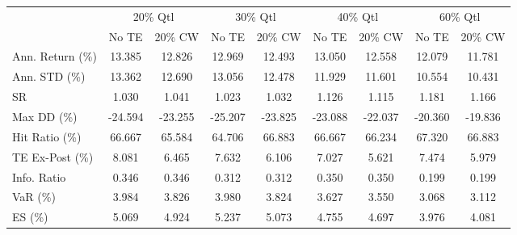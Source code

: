 \begin{tabular}{lcccccccc}
\toprule
{} & \multicolumn{2}{c}{20\% Qtl} & \multicolumn{2}{c}{30\% Qtl} & \multicolumn{2}{c}{40\% Qtl} & \multicolumn{2}{c}{60\% Qtl} \\
{} &   No TE &  20\% CW &   No TE &  20\% CW &   No TE &  20\% CW &   No TE &  20\% CW \\
\midrule
Ann. Return (\%) &  13.385 &  12.826 &  12.969 &  12.493 &  13.050 &  12.558 &  12.079 &  11.781 \\
Ann. STD (\%)    &  13.362 &  12.690 &  13.056 &  12.478 &  11.929 &  11.601 &  10.554 &  10.431 \\
SR              &   1.030 &   1.041 &   1.023 &   1.032 &   1.126 &   1.115 &   1.181 &   1.166 \\
Max DD (\%)      & -24.594 & -23.255 & -25.207 & -23.825 & -23.088 & -22.037 & -20.360 & -19.836 \\
Hit Ratio (\%)   &  66.667 &  65.584 &  64.706 &  66.883 &  66.667 &  66.234 &  67.320 &  66.883 \\
TE Ex-Post (\%)  &   8.081 &   6.465 &   7.632 &   6.106 &   7.027 &   5.621 &   7.474 &   5.979 \\
Info. Ratio     &   0.346 &   0.346 &   0.312 &   0.312 &   0.350 &   0.350 &   0.199 &   0.199 \\
VaR (\%)         &   3.984 &   3.826 &   3.980 &   3.824 &   3.627 &   3.550 &   3.068 &   3.112 \\
ES (\%)          &   5.069 &   4.924 &   5.237 &   5.073 &   4.755 &   4.697 &   3.976 &   4.081 \\
\bottomrule
\end{tabular}
